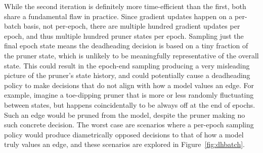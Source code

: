 While the second iteration is definitely more time-efficient than the first, both share a fundamental flaw in practice.
Since gradient updates happen on a per-batch basis, not per-epoch, there are multiple
hundred gradient updates per epoch, and thus multiple hundred pruner states per epoch. Sampling just the final epoch state
means the deadheading decision is based on a tiny fraction of the pruner state, which is unlikely to be meaningfully
representative of the overall state. This could result in the epoch-end sampling producing a very
misleading picture of the pruner's state history, and could potentially cause a deadheading policy to make decisions that
do not align with how a model values an edge. For example, imagine a toe-dipping pruner that is more or less randomly fluctuating between
states, but happens coincidentally to be always off at the end of epochs. Such an edge would be pruned from the model,
despite the pruner making no such concrete decision. The worst case are scenarios where a per-epoch sampling policy
would produce diametrically opposed decisions to that of how a model truly values an edge, and these scenarios are explored in
Figure~\ref{fig:dhbatch}.

